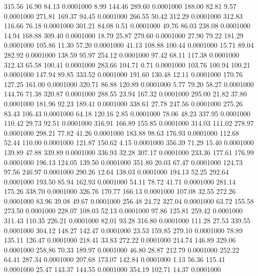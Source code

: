  315.56   16.90   84.13   0.0001000
   8.99  144.46  289.60   0.0001000
 188.00   82.81    9.57   0.0001000
 271.81  169.37   94.45   0.0001000
 266.55   50.42  312.29   0.0001000
 312.83  116.66   76.18   0.0001000
 301.21   84.08    0.51   0.0001000
  49.76   86.03  238.08   0.0001000
  14.94  168.88  309.40   0.0001000
  18.79   25.87  279.60   0.0001000
  27.90   79.22  181.29   0.0001000
 105.86   11.30   57.20   0.0001000
  41.13  108.88  100.44   0.0001000
  15.71   89.04  282.92   0.0001000
 138.59   95.97  254.12   0.0001000
  97.42   68.11  117.38   0.0001000
 312.43   65.58  100.41   0.0001000
 283.66  104.71    0.71   0.0001000
 103.76  100.94  100.21   0.0001000
 147.94   89.85  333.52   0.0001000
 191.60  130.48   12.11   0.0001000
 170.76  127.25  161.00   0.0001000
 320.71   86.88  120.89   0.0001000
   5.77   79.20   58.27   0.0001000
 144.76   71.38  320.87   0.0001000
 288.55   23.94  167.32   0.0001000
 295.00   21.82   37.80   0.0001000
 181.96   92.23  189.41   0.0001000
 338.61   27.78  247.56   0.0001000
 275.26   83.43  106.43   0.0001000
  64.18  120.16    2.85   0.0001000
  78.06   48.23  337.95   0.0001000
 110.42   29.73   92.51   0.0001000
 316.91  166.89  155.85   0.0001000
 314.03  111.02  278.97   0.0001000
 298.21   77.82   41.26   0.0001000
 183.88   98.63  176.93   0.0001000
 112.68   52.44  110.00   0.0001000
 121.87  150.62    4.15   0.0001000
 356.39   71.29   15.40   0.0001000
 139.89   47.88  339.89   0.0001000
 336.93   32.28  307.17   0.0001000
 233.36  177.61  176.99   0.0001000
 196.13  124.05  139.50   0.0001000
 351.80   20.03   67.47   0.0001000
 124.73   97.56  246.97   0.0001000
 290.26   12.64  138.03   0.0001000
 194.13   52.25  292.64   0.0001000
 193.50   85.94  162.93   0.0001000
  54.11   78.72   41.71   0.0001000
 281.14  175.26  338.70   0.0001000
 326.76  170.77  166.13   0.0001000
 107.08   32.55  272.26   0.0001000
  83.96   39.08   49.67   0.0001000
 256.48   24.72  327.04   0.0001000
  63.72  155.58  273.50   0.0001000
 228.07  108.03   52.13   0.0001000
  97.86  125.81  259.42   0.0001000
 311.43  110.35  226.21   0.0001000
  82.01   93.28  316.80   0.0001000
 111.28   27.53  339.55   0.0001000
 304.12  148.27  142.47   0.0001000
  23.53  159.85  279.10   0.0001000
  78.89  135.11  126.47   0.0001000
 218.41   33.83  272.22   0.0001000
 214.74  146.89  329.06   0.0001000
 258.86   70.33  189.97   0.0001000
  46.80   28.87  212.79   0.0001000
 252.22   64.41  287.34   0.0001000
 207.68  173.07  142.84   0.0001000
   1.13   56.36  115.41   0.0001000
  25.47  143.37  144.55   0.0001000
 354.19  102.71   14.37   0.0001000
